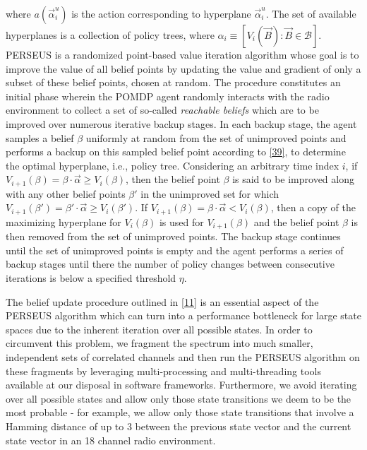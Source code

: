 \documentclass[10pt,twocolumn]{IEEEtran}
\begin{document}
where $a(\vec{\alpha}_i^{u})$ is the action corresponding to hyperplane $\vec{\alpha}_i^{u}$. The set of available hyperplanes is a collection of policy trees, where $\alpha_{i} \equiv [V_{i}(\vec{B}): \vec{B} \in \mathcal{B}]$. PERSEUS is a randomized point-based value iteration algorithm whose goal is to improve the value of all belief points by updating the value and gradient of only a subset of these belief points, chosen at random. The procedure constitutes an initial phase wherein the POMDP agent randomly interacts with the radio environment to collect a set of so-called \emph{reachable beliefs} which are to be improved over numerous iterative backup stages. In each backup stage, the agent samples a belief $\beta$ uniformly at random from the set of unimproved points and performs a backup on this sampled belief point according to \eqref{39}, to determine the optimal hyperplane, i.e., policy tree. Considering an arbitrary time index $i$, if $V_{i+1}(\beta) = \beta \cdot \vec{\alpha} \geq V_{i}(\beta)$, then the belief point $\beta$ is said to be improved along with any other belief points $\beta'$ in the unimproved set for which $V_{i+1}(\beta') = \beta' \cdot \vec{\alpha} \geq V_{i}(\beta')$. If $V_{i+1}(\beta) = \beta \cdot \vec{\alpha} < V_{i}(\beta)$, then a copy of the maximizing hyperplane for $V_i(\beta)$ is used for $V_{i+1}(\beta)$ and the belief point $\beta$ is then removed from the set of unimproved points. The backup stage continues until the set of unimproved points is empty and the agent performs a series of backup stages until there the number of policy changes between consecutive iterations is below a specified threshold $\eta$.

The belief update procedure outlined in \eqref{11} is an essential aspect of the PERSEUS algorithm which can turn into a performance bottleneck for large state spaces due to the inherent iteration over all possible states. In order to circumvent this problem, we fragment the spectrum into much smaller, independent sets of correlated channels and then run the PERSEUS algorithm on these fragments by leveraging multi-processing and multi-threading tools available at our disposal in software frameworks. Furthermore, we avoid iterating over all possible states and allow only those state transitions we deem to be the most probable - for example, we allow only those state transitions that involve a Hamming distance of up to 3 between the previous state vector and the current state vector in an 18 channel radio environment.
\end{document}

